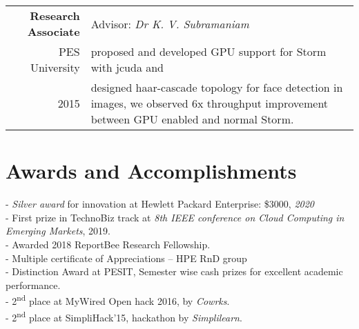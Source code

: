 \documentclass[a4paper,10pt]{article}
\begin{document}
\begin{tabular}{r|p{11cm}}
\textbf{Research Associate} & Advisor: \emph{Dr K. V. Subramaniam} \\
PES University & proposed and developed GPU support for Storm with jcuda and \\ 2015 & designed haar-cascade topology for face detection in images, we observed 6x  throughput improvement between GPU enabled and normal Storm.
\end{tabular}


\section{Awards and Accomplishments}
- \emph{Silver award} for innovation at Hewlett Packard Enterprise: \$3000, \emph{2020} \\
- First prize in TechnoBiz track at \emph{8th IEEE conference on Cloud Computing in Emerging Markets}, 2019.\\
- Awarded 2018 ReportBee Research Fellowship.\\
- Multiple certificate of Appreciations – HPE RnD group \\
- Distinction Award at PESIT, Semester wise cash prizes for excellent academic performance.\\
- 2\textsuperscript{nd} place at MyWired Open hack 2016, by \emph{Cowrks}. \\
- 2\textsuperscript{nd} place at SimpliHack’15, hackathon by \emph{Simplilearn}. \\
\end{document}
